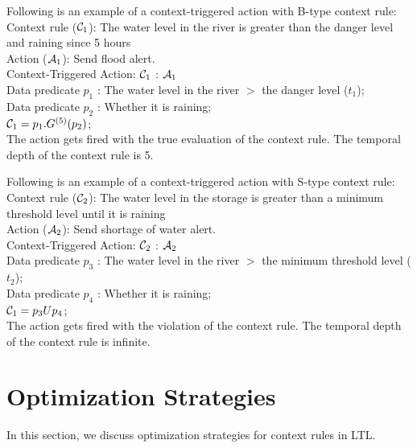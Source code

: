 \begin{example}
 Following is an example of a context-triggered action with B-type context rule: \\
 \noindent
 Context rule (${\cal{C}}_1$): The water level in the river is greater than the danger level and raining since 5 hours\\
 Action (${\cal{A}}_1$): Send flood alert. \\
 Context-Triggered Action: ${\cal{C}}_1$ : ${\cal{A}}_1$ \\
 Data predicate $p_1$ : The water level in the river $>$ the danger level ($t_1$); \\
 Data predicate $p_2$ : Whether it is raining; \\ 
 ${{\cal{C}}_1} = p_1 . G^{(5)}(p_2)$;\\ 
 The action gets fired with the true evaluation of the context rule.
 The temporal depth of the context rule is 5.  
 
 \noindent
 Following is an example of a context-triggered action with S-type context rule: \\
 Context rule (${\cal{C}}_2$): The water level in the storage is greater than a minimum threshold level until it is raining\\
 Action (${\cal{A}}_2$): Send shortage of water alert. \\
 Context-Triggered Action: ${\cal{C}}_2$ : ${\cal{A}}_2$ \\
 Data predicate $p_3$ : The water level in the river $>$ the minimum threshold level ($t_2$); \\
 Data predicate $p_4$ : Whether it is raining; \\
 ${{\cal{C}}_1} = p_3 U p_4$;\\ 
 The action gets fired with the violation of the context rule.
 The temporal depth of the context rule is infinite. 
\end{example}


\section{Optimization Strategies}\label{seclo}
\noindent
In this section, we discuss optimization strategies for context rules in LTL.

